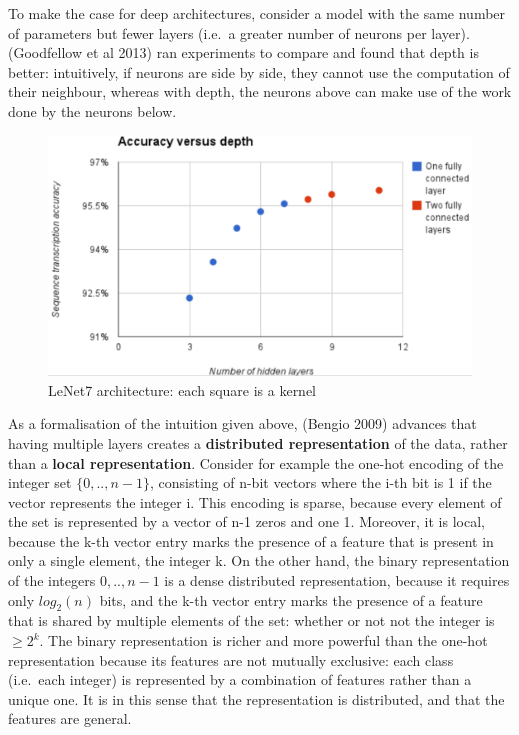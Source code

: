 \documentclass[a4paper,11pt]{article}
\begin{document}
To make the case for deep architectures, consider a model with the same number of parameters but fewer layers (i.e.\ a greater number of neurons per layer). (Goodfellow et al 2013) \cite{goodfellow_street_view} ran experiments to compare and found that depth is better: intuitively, if neurons are side by side, they cannot use the computation of their neighbour, whereas with depth, the neurons above can make use of the work done by the neurons below. \\	

\begin{figure}[h!]
	\centering
	\includegraphics[scale=0.3]{images/more_layers_better.png}
	\caption{LeNet7 architecture: each square is a kernel}
\end{figure}

As a formalisation of the intuition given above, (Bengio 2009) \cite{DL-book} advances that having multiple layers creates a \textbf{distributed representation} of the data, rather than a \textbf{local representation}. Consider for example the one-hot encoding of the integer set $\{0, .., n-1\}$, consisting of n-bit vectors where the i-th bit is 1 if the vector represents the integer i. This encoding is sparse, because every element of the set is represented by a vector of n-1 zeros and one 1. Moreover, it is local, because the k-th vector entry marks the presence of a feature that is present in only a single element, the integer k. On the other hand, the binary representation of the integers ${0, .., n-1}$ is a dense distributed representation, because it requires only $log_2(n)$ bits, and the k-th vector entry marks the presence of a feature that is shared by multiple elements of the set: whether or not not the integer is $\geq 2^k$. The binary representation is richer and more powerful than the one-hot representation because its features are not mutually exclusive: each class (i.e.\ each integer) is represented by a combination of features rather than a unique one. It is in this sense that the representation is distributed, and that the features are general. \\
\end{document}
